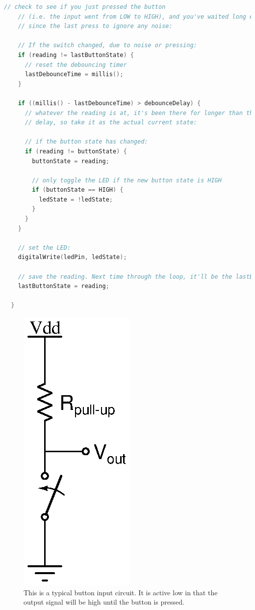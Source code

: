 \begin{lstlisting}[language=C++, caption={This is the Arduino example of software debouncing.},label={lst:debounce}]
	// check to see if you just pressed the button
	// (i.e. the input went from LOW to HIGH), and you've waited long enough
	// since the last press to ignore any noise:
  
	// If the switch changed, due to noise or pressing:
	if (reading != lastButtonState) {
	  // reset the debouncing timer
	  lastDebounceTime = millis();
	}
  
	if ((millis() - lastDebounceTime) > debounceDelay) {
	  // whatever the reading is at, it's been there for longer than the debounce
	  // delay, so take it as the actual current state:
  
	  // if the button state has changed:
	  if (reading != buttonState) {
		buttonState = reading;
  
		// only toggle the LED if the new button state is HIGH
		if (buttonState == HIGH) {
		  ledState = !ledState;
		}
	  }
	}
  
	// set the LED:
	digitalWrite(ledPin, ledState);
  
	// save the reading. Next time through the loop, it'll be the lastButtonState:
	lastButtonState = reading;
  
  }
\end{lstlisting}

\begin{figure}[!htb]
	\centering
	\includegraphics{buttonSerial/button1.eps}
	\caption{This is a typical button input circuit. It is active low in that the output signal will be high until the button is pressed.}
	\label{fig:buttonPullup}
\end{figure}

